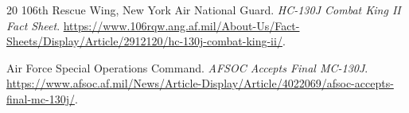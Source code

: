 \documentclass[8pt,twocolumn]{extarticle}
\begin{document}
\begin{thebibliography}{20}
106th Rescue Wing, New York Air National Guard.
\newblock \emph{HC-130J Combat King II Fact Sheet}.
\newblock \url{https://www.106rqw.ang.af.mil/About-Us/Fact-Sheets/Display/Article/2912120/hc-130j-combat-king-ii/}.

Air Force Special Operations Command.
\newblock \emph{AFSOC Accepts Final MC-130J}.
\newblock \url{https://www.afsoc.af.mil/News/Article-Display/Article/4022069/afsoc-accepts-final-mc-130j/}.

\end{thebibliography}
\end{document}
